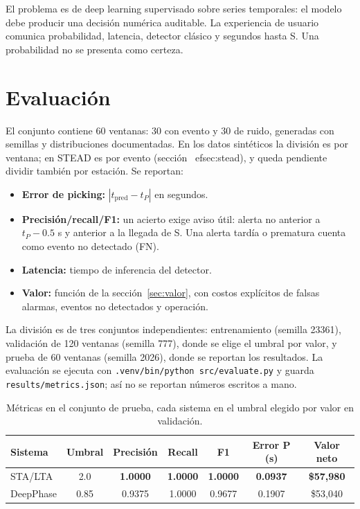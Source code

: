 \documentclass[11pt,letterpaper]{article}
\begin{document}
El problema es de deep learning supervisado sobre series temporales: el modelo
debe producir una decisión numérica auditable. La experiencia de usuario comunica probabilidad,
latencia, detector clásico y segundos hasta S. Una probabilidad no se presenta
como certeza.

\section{Evaluación}
El conjunto contiene 60 ventanas: 30 con evento y 30 de ruido, generadas con
semillas y distribuciones documentadas. En los datos sintéticos la división es por
ventana; en STEAD es por evento (sección~
ef{sec:stead}), y queda pendiente
dividir también por estación. Se reportan:
\begin{itemize}[leftmargin=*]
\item \textbf{Error de picking:} $|t_{\mathrm{pred}}-t_P|$ en segundos.
\item \textbf{Precisión/recall/F1:} un acierto exige aviso útil: alerta no
  anterior a $t_P-0.5$ s y anterior a la llegada de S. Una alerta tardía o
  prematura cuenta como evento no detectado (FN).
\item \textbf{Latencia:} tiempo de inferencia del detector.
\item \textbf{Valor:} función de la sección~\ref{sec:valor}, con costos explícitos de
  falsas alarmas, eventos no detectados y operación.
\end{itemize}
La división es de tres conjuntos independientes: entrenamiento (semilla 23361),
validación de 120 ventanas (semilla 777), donde se elige el umbral por valor, y
prueba de 60 ventanas (semilla 2026), donde se reportan los resultados.
La evaluación se ejecuta con \texttt{.venv/bin/python src/evaluate.py} y guarda
\texttt{results/metrics.json}; así no se reportan números escritos a mano.

\begin{table}[h]
\centering
\caption{Métricas en el conjunto de prueba, cada sistema en el umbral elegido por valor en validación.}
\begin{tabular}{lcccccc}
\toprule
Sistema & Umbral & Precisión & Recall & F1 & Error P (s) & Valor neto\\
\midrule
STA/LTA & 2.0 & \textbf{1.0000} & \textbf{1.0000} & \textbf{1.0000} & \textbf{0.0937} & \textbf{\$57,980}\\
DeepPhase & 0.85 & 0.9375 & 1.0000 & 0.9677 & 0.1907 & \$53,040\\
\bottomrule
\end{tabular}
\end{table}
\end{document}
